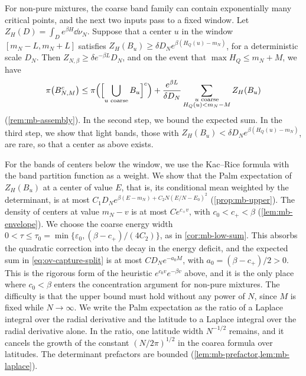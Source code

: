 For non-pure mixtures, the coarse band family can contain exponentially many critical points, and the next two inputs pass to a fixed window. Let $Z_H(D)=\int_De^{\beta H}\dd\nu_N$. Suppose that a center $u$ in the window $[m_N-L,m_N+L]$ satisfies $Z_H(B_u)\ge\delta D_Ne^{\beta(H_Q(u)-m_N)}$, for a deterministic scale $D_N$. Then $Z_{N,\beta}\ge\delta e^{-\beta L}D_N$, and on the event that $\max H_Q\le m_N+M$, we have
\begin{equation}\label{eq:ov-capture-split}
\pi\bigl(B_{N,M}^c\bigr)\le\pi\Bigl(\Bigl[\bigcup_{u\text{ coarse}}B_u\Bigr]^c\Bigr)+\frac{e^{\beta L}}{\delta D_N}\sum_{\substack{u\text{ coarse}\\H_Q(u)<m_N-M}}Z_H(B_u)
\end{equation}
(\cref{rem:mb-assembly}). In the second step, we bound the expected sum. In the third step, we show that light bands, those with $Z_H(B_u)<\delta D_Ne^{\beta(H_Q(u)-m_N)}$, are rare, so that a center as above exists.

For the bands of centers below the window, we use the Kac--Rice formula with the band partition function as a weight. We show that the Palm expectation of $Z_H(B_u)$ at a center of value $E$, that is, its conditional mean weighted by the determinant, is at most $C_1D_Ne^{\beta(E-m_N)+C_2N(E/N-E_0)^2}$ (\cref{prop:mb-upper}). The density of centers at value $m_N-v$ is at most $Ce^{c_+v}$, with $c_0<c_+<\beta$ (\cref{lem:mb-envelope}). We choose the coarse energy width $0<\tau\le\tau_0=\min\{\varepsilon_0,(\beta-c_+)/(4C_2)\}$, as in \cref{cor:mb-low-sum}. This absorbs the quadratic correction into the decay in the energy deficit, and the expected sum in \eqref{eq:ov-capture-split} is at most $CD_Ne^{-a_0M}$, with $a_0=(\beta-c_+)/2>0$. This is the rigorous form of the heuristic $e^{c_0v}e^{-\beta v}$ above, and it is the only place where $c_0<\beta$ enters the concentration argument for non-pure mixtures. The difficulty is that the upper bound must hold without any power of $N$, since $M$ is fixed while $N\to\infty$. We write the Palm expectation as the ratio of a Laplace integral over the radial derivative and the latitude to a Laplace integral over the radial derivative alone. In the ratio, one latitude width $N^{-1/2}$ remains, and it cancels the growth of the constant $(N/2\pi)^{1/2}$ in the coarea formula over latitudes. The determinant prefactors are bounded (\cref{lem:mb-prefactor,lem:mb-laplace}).

